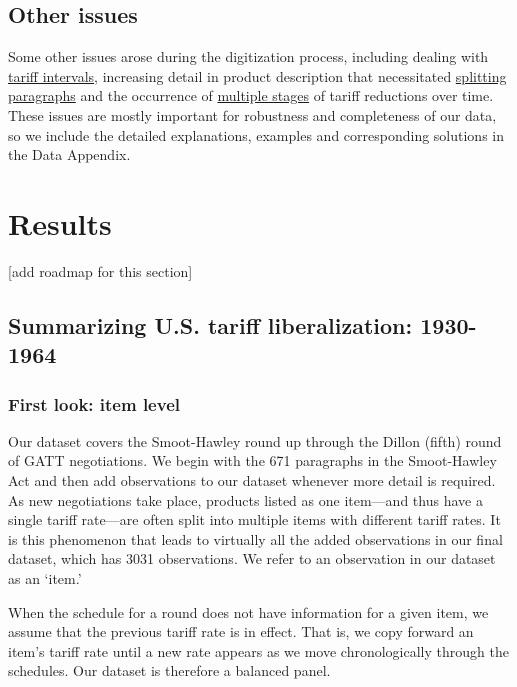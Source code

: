 \documentclass[
  12pt,
]{article}
\begin{document}
\hypertarget{other-issues}{%
\subsection{Other issues}\label{other-issues}}

Some other issues arose during the digitization process, including dealing with \protect\hyperlink{int}{tariff intervals}, increasing detail in product description that necessitated \protect\hyperlink{split}{splitting paragraphs} and the occurrence of \protect\hyperlink{staging}{multiple stages} of tariff reductions over time. These issues are mostly important for robustness and completeness of our data, so we include the detailed explanations, examples and corresponding solutions in the Data Appendix.

\hypertarget{results}{%
\section{Results}\label{results}}

{[}add roadmap for this section{]}

\hypertarget{summarizing-u.s.-tariff-liberalization-1930-1964}{%
\subsection{Summarizing U.S. tariff liberalization: 1930-1964}\label{summarizing-u.s.-tariff-liberalization-1930-1964}}

\hypertarget{first-look-item-level}{%
\subsubsection{First look: item level}\label{first-look-item-level}}

Our dataset covers the Smoot-Hawley round up through the Dillon (fifth) round of GATT negotiations. We begin with the 671 paragraphs in the Smoot-Hawley Act and then add observations to our dataset whenever more detail is required. As new negotiations take place, products listed as one item---and thus have a single tariff rate---are often split into multiple items with different tariff rates. It is this phenomenon that leads to virtually all the added observations in our final dataset, which has 3031 observations. We refer to an observation in our dataset as an `item.'

When the schedule for a round does not have information for a given item, we assume that the previous tariff rate is in effect. That is, we copy forward an item's tariff rate until a new rate appears as we move chronologically through the schedules. Our dataset is therefore a balanced panel.
\end{document}
